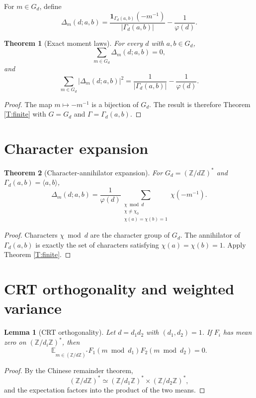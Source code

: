 \documentclass[11pt]{article}
\newtheorem{theorem}{Theorem}
\newtheorem{lemma}{Lemma}
\newcommand{\Z}{\mathbb Z}
\newcommand{\E}{\mathbb E}
\newcommand{\1}{\mathbf 1}
\begin{document}
For \(m\in G_d\), define
\[
\Delta_m(d;a,b)=
\frac{\1_{\Gamma_d(a,b)}(-m^{-1})}{|\Gamma_d(a,b)|}
-
\frac1{\varphi(d)}.
\]

\begin{theorem}[Exact moment laws]\label{T:moments}
For every \(d\) with \(a,b\in G_d\),
\[
\sum_{m\in G_d}\Delta_m(d;a,b)=0,
\]
and
\[
\sum_{m\in G_d}|\Delta_m(d;a,b)|^2
=
\frac1{|\Gamma_d(a,b)|}-\frac1{\varphi(d)}.
\]
\end{theorem}

\begin{proof}
The map \(m\mapsto -m^{-1}\) is a bijection of \(G_d\).  The result is therefore Theorem \ref{T:finite} with \(G=G_d\) and \(\Gamma=\Gamma_d(a,b)\).
\end{proof}

\section{Character expansion}

\begin{theorem}[Character-annihilator expansion]\label{T:char}
For \(G_d=(\Z/d\Z)^*\) and \(\Gamma_d(a,b)=\langle a,b\rangle\),
\[
\Delta_m(d;a,b)=
\frac1{\varphi(d)}
\sum_{\substack{\chi\bmod d\\ \chi\ne\chi_0\\ \chi(a)=\chi(b)=1}}
\chi(-m^{-1}).
\]
\end{theorem}

\begin{proof}
Characters \(\chi\bmod d\) are the character group of \(G_d\).  The annihilator of \(\Gamma_d(a,b)\) is exactly the set of characters satisfying \(\chi(a)=\chi(b)=1\).  Apply Theorem \ref{T:finite}.
\end{proof}

\section{CRT orthogonality and weighted variance}

\begin{lemma}[CRT orthogonality]\label{L:crt}
Let \(d=d_1d_2\) with \((d_1,d_2)=1\).  If \(F_i\) has mean zero on \((\Z/d_i\Z)^*\), then
\[
\E_{m\in(\Z/d\Z)^*}F_1(m\bmod d_1)F_2(m\bmod d_2)=0.
\]
\end{lemma}

\begin{proof}
By the Chinese remainder theorem,
\[
(\Z/d\Z)^*\simeq(\Z/d_1\Z)^*\times(\Z/d_2\Z)^*,
\]
and the expectation factors into the product of the two means.
\end{proof}
\end{document}
